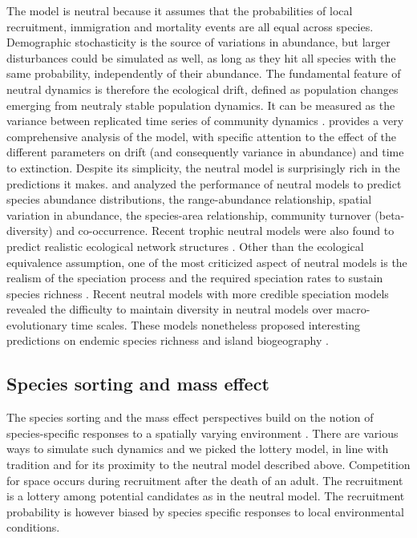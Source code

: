 \documentclass[12pt]{article}
\begin{document}
The model is neutral because it assumes that the probabilities of local
recruitment, immigration and mortality events are all equal across species.
Demographic stochasticity is the source of variations in abundance, but larger
disturbances could be simulated as well, as long as they hit all species with
the same probability, independently of their abundance. The fundamental feature
of neutral dynamics is therefore the ecological drift, defined as population
changes emerging from neutraly stable population dynamics. It can be measured as
the variance between replicated time series of community dynamics
\parencite{Gravel2011a}. \textcite{Hubbell2001} provides a very comprehensive
analysis of the model, with specific attention to the effect of the different
parameters on drift (and consequently variance in abundance) and time to
extinction. Despite its simplicity, the neutral model is surprisingly rich in
the predictions it makes. \textcite{Bell2001} and \textcite{Hubbell2001}
analyzed the performance of neutral models to predict species abundance
distributions, the range-abundance relationship, spatial variation in abundance,
the species-area relationship, community turnover (beta-diversity) and
co-occurrence. Recent trophic neutral models were also found to predict
realistic ecological network structures \parencite{Canard2012}. Other than the
ecological equivalence assumption, one of the most criticized aspect of neutral
models is the realism of the speciation process and the required speciation
rates to sustain species richness \parencite{Ricklefs2003,Etienne2007}. Recent
neutral models with more credible speciation models
\parencite{Rosindell2010,Desjardins2012a} revealed the difficulty to maintain
diversity in neutral models over macro-evolutionary time scales. These models
nonetheless proposed interesting predictions on endemic species richness and
island biogeography \parencite{Rosindell2011,Desjardins2012b}.

\subsection*{Species sorting and mass effect}

The species sorting and the mass effect perspectives build on the notion of
species-specific responses to a spatially varying environment
\parencite{Leibold2004a}. There are various ways to simulate such dynamics and
we picked the lottery model, in line with tradition \parencite{Mouquet2002} and
for its proximity to the neutral model described above. Competition for space
occurs during recruitment after the death of an adult. The recruitment is a
lottery among potential candidates as in the neutral model. The recruitment probability 
is however biased by species specific responses to local environmental conditions. 
\end{document}
